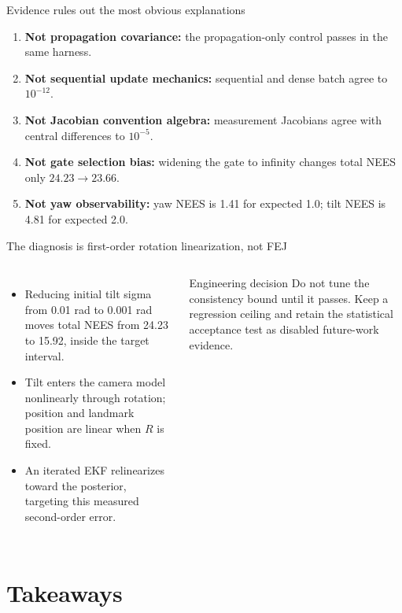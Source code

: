 \documentclass[10pt,aspectratio=169]{beamer}
\begin{document}
\begin{frame}{Evidence rules out the most obvious explanations}
  \begin{enumerate}
    \item \textbf{Not propagation covariance:} the propagation-only control passes in the same harness.
    \item \textbf{Not sequential update mechanics:} sequential and dense batch agree to $10^{-12}$.
    \item \textbf{Not Jacobian convention algebra:} measurement Jacobians agree with central differences to $10^{-5}$.
    \item \textbf{Not gate selection bias:} widening the gate to infinity changes total NEES only $24.23\rightarrow23.66$.
    \item \textbf{Not yaw observability:} yaw NEES is 1.41 for expected 1.0; tilt NEES is 4.81 for expected 2.0.
  \end{enumerate}
\end{frame}

\begin{frame}{The diagnosis is first-order rotation linearization, not FEJ}
  \begin{columns}[T]
    \begin{itemize}
      \item Reducing initial tilt sigma from 0.01 rad to 0.001 rad moves total NEES from 24.23 to 15.92, inside the target interval.
      \item Tilt enters the camera model nonlinearly through rotation; position and landmark position are linear when $R$ is fixed.
      \item An iterated EKF relinearizes toward the posterior, targeting this measured second-order error.
    \end{itemize}
    \begin{block}{Engineering decision}
      Do not tune the consistency bound until it passes. Keep a regression ceiling and retain the statistical acceptance test as disabled future-work evidence.
    \end{block}
  \end{columns}
\end{frame}

\section{Takeaways}
\end{document}
